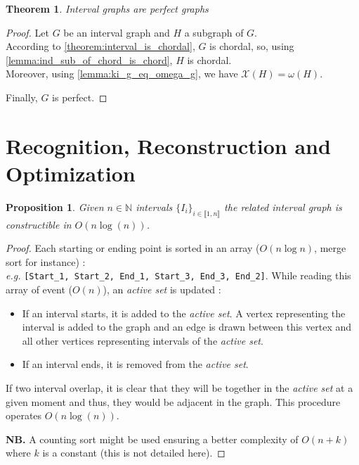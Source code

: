 \documentclass{article}
\newtheorem{theorem}{Theorem}[section]
\newtheorem{proposition}{Proposition}[section]
\begin{document}
\newpage

\begin{theorem}
    \label{theorem:interval_is_perfect}
    Interval graphs are perfect graphs
\end{theorem}
    
\begin{proof}
    Let $G$ be an interval graph and $H$ a subgraph of $G$.\\
    According to \cref{theorem:interval_is_chordal}, $G$ is chordal, so, using \cref{lemma:ind_sub_of_chord_is_chord}, $H$ is chordal.\\
    Moreover, using \cref{lemma:ki_g_eq_omega_g}, we have $\mathcal{X}(H)=\omega(H)$. \medskip

    Finally, $G$ is perfect.
\end{proof}

\section{Recognition, Reconstruction and Optimization}

\begin{proposition}
    Given $n\in \mathbb{N}$ intervals $\{I_i\}_{i\in\llbracket 1, n \rrbracket}$ the related interval graph is constructible in $O(n\log(n))$.
\end{proposition}

\begin{proof}
    Each starting or ending point is sorted in an array ($O(n\log{n})$, merge sort for instance) : \\ 
    \textit{e.g.} \lstinline![Start_1, Start_2, End_1, Start_3, End_3, End_2]!.
    While reading this array of event ($O(n)$), an \emph{active set} is updated :

    \begin{itemize}
        \item If an interval starts, it is added to the \emph{active set}.
        A vertex representing the interval is added to the graph and an edge is drawn between 
        this vertex and all other vertices representing intervals of the \emph{active set}.
        \item If an interval ends, it is removed from the \emph{active set}.
    \end{itemize}

    If two interval overlap, it is clear that they will be together in the \emph{active set} at a given moment and thus, 
    they would be adjacent in the graph. This procedure operates $O(n\log(n))$.

    \textbf{NB.} A counting sort might be used ensuring a better complexity of $O(n+k)$ where $k$ is a constant (this is not detailed here).
\end{proof}
\end{document}
